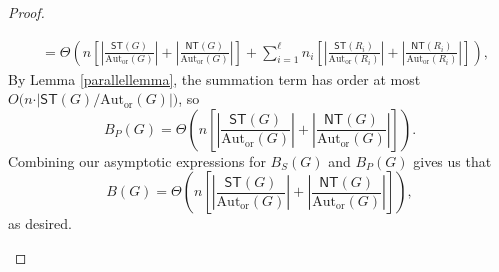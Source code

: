 \documentclass[10pt,a4paper]{amsart}
\begin{document}
\begin{proof}
\begin{enumerate}
\begin{align*}
            &= \Theta\left(n\left[\left\vert \frac{\textsf{ST}(G)}{\text{Aut}_\text{or}(G)}\right\vert + \left\vert \frac{\textsf{NT}(G)}{\text{Aut}_\text{or}(G)}\right\vert\right] + \sum_{i = 1}^\ell n_i\left[\left\vert \frac{\textsf{ST}(R_i)}{\text{Aut}_\text{or}(R_i)}\right\vert + \left\vert \frac{\textsf{NT}(R_i)}{\text{Aut}_\text{or}(R_i)}\right\vert\right]\right),
        \end{align*}
        By Lemma \ref{parallellemma}, the summation term has order at most $O\big(n\cdot\vert \textsf{ST}(G)/\text{Aut}_\text{or}(G)\vert\big)$, so
        \[B_P(G) =  \Theta\left(n\left[\left\vert \frac{\textsf{ST}(G)}{\text{Aut}_\text{or}(G)}\right\vert + \left\vert \frac{\textsf{NT}(G)}{\text{Aut}_\text{or}(G)}\right\vert\right] \right).\] Combining our asymptotic expressions for $B_S(G)$ and $B_P(G)$ gives us that
        \[B(G) = \Theta\left(n\left[\left\vert \frac{\textsf{ST}(G)}{\text{Aut}_\text{or}(G)}\right\vert + \left\vert \frac{\textsf{NT}(G)}{\text{Aut}_\text{or}(G)}\right\vert\right] \right),\] as desired.


\end{enumerate}
\end{proof}
\end{document}

